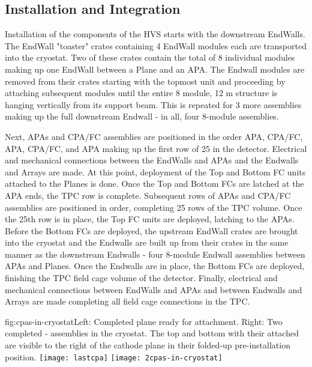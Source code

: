 \subsection{Installation and Integration}
\label{sec:fdsp-hv-transport-install}
Installation of the components of the HVS starts with the downstream EndWalls.  The EndWall "toaster" crates containing 4 EndWall modules each are transported into the cryostat.  Two of these crates contain the total of 8 individual modules making up one EndWall between a  Plane and an APA.  The Endwall modules are removed from their crates starting with the topmost unit and proceeding by attaching subsequent modules until the entire 8 module, 12 m structure is hanging vertically from its support beam.  This is repeated for 3 more assemblies making up the full downstream Endwall - in all, four 8-module assemblies.  

Next, APAs and CPA/FC assemblies are positioned in the order APA, CPA/FC, APA, CPA/FC, and APA making up the first row of 25 in the detector.  Electrical and mechanical connections between the EndWalls and APAs and the Endwalls and  Arrays are made.  At this point, deployment of the Top and Bottom FC units attached to the  Planes is done.  Once the Top and Bottom FCs are latched at the APA ends, the TPC row is complete.  Subsequent rows of APAs and CPA/FC assemblies are positioned in order, completing 25 rows of the TPC volume.  Once the 25th row is in place, the Top FC units are deployed, latching to the APAs.  Before the Bottom FCs are deployed, the upstream EndWall crates are brought into the cryostat and the Endwalls are built up from their crates in the same manner as the downstream Endwalls - four 8-module Endwall assemblies between APAs and  Planes.  Once the Endwalls are in place, the Bottom FCs are deployed, finishing the TPC field cage volume of the detector.  Finally, electrical and mechanical connections between EndWalls and APAs and between Endwalls and  Arrays are made completing all field cage connections in the TPC.


\begin{dunefigure}{fig:cpas-in-cryostat}{Left: Completed   plane ready for  attachment. Right: Two completed - assemblies in the  cryostat. The top and bottom  with their  attached are visible to the right of the cathode plane in their folded-up pre-installation position.}
\texttt{[image: lastcpa]}
\texttt{[image: 2cpas-in-cryostat]}
\end{dunefigure}

